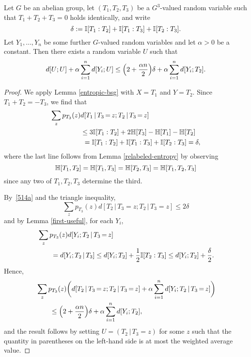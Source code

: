 \begin{lemma}
  \label{lem:get-better}
  Let $G$ be an abelian group, let $(T_1,T_2,T_3)$ be a $G^3$-valued random variable such that $T_1+T_2+T_3=0$ holds identically, and write
  \[
    \delta := \mathbb{I}[T_1 : T_2] + \mathbb{I}[T_1 : T_3] + \mathbb{I}[T_2 : T_3].
  \]
  Let $Y_1,\dots,Y_n$ be some further $G$-valued random variables and let $\alpha>0$ be a constant.
  Then there exists a random variable $U$ such that
  \begin{equation}
    \label{eq:get-better}
    d[U;U] + \alpha \sum_{i=1}^n d[Y_i;U] \leq \Bigl(2 + \frac{\alpha n}{2} \Bigr) \delta + \alpha \sum_{i=1}^n d[Y_i;T_2].
  \end{equation}
\end{lemma}
\begin{proof}%
  We apply Lemma \ref{entropic-bsg} with $X=T_1$ and $Y=T_2$.
  Since $T_1+T_2=-T_3$, we find that
  \begin{align}\nonumber
    \sum_{z} p_{T_3}(z) & d[T_1 \,|\, T_3 \mathop{=} z;T_2 \,|\, T_3 \mathop{=} z] \\ \nonumber
    &\leq  3 \mathbb{I}[T_1 : T_2] + 2 \mathbb{H}[T_3] - \mathbb{H}[T_1] - \mathbb{H}[T_2] \\
    &\ = \mathbb{I}[T_1 : T_2] + \mathbb{I}[T_1 : T_3] + \mathbb{I}[T_2 : T_3]
    = \delta,\label{514a}
  \end{align}
  where the last line follows from Lemma \ref{relabeled-entropy} by observing
  \[
    \mathbb{H}[T_1,T_2] = \mathbb{H}[T_1,T_3] = \mathbb{H}[T_2,T_3] = \mathbb{H}[T_1,T_2,T_3]
  \]
  since any two of $T_1,T_2,T_3$ determine the third.

  By~\eqref{514a} and the triangle inequality,
  \[
    \sum_z p_{T_3}(z) d[T_2 \,|\, T_3 \mathop{=} z; T_2 \,|\, T_3\mathop{=}z] \leq 2 \delta
  \]
  and by Lemma \ref{first-useful}, for each $Y_i$,
  \begin{align*}
    &\sum_z p_{T_3}(z) d[Y_i; T_2 \,|\, T_3 \mathop{=} z] \\
    &\qquad= d[Y_i; T_2 \,|\, T_3]
                                    \leq d[Y_i;T_2] + \frac12 \mathbb{I}[T_2 : T_3]
                                    \leq d[Y_i;T_2] + \frac{\delta}{2}.
  \end{align*}
  Hence,
  \begin{align*}
    &\sum_z p_{T_3}(z) \bigg( d[T_2 \,|\, T_3 \mathop{=} z; T_2 \,|\, T_3 \mathop{=} z] + \alpha \sum_{i=1}^n d[Y_i;T_2 \,|\, T_3 \mathop{=} z] \bigg) \\
    &\qquad \leq
    \Bigl(2 + \frac{\alpha n}{2} \Bigr) \delta + \alpha \sum_{i=1}^n d[Y_i; T_2],
  \end{align*}
  and the result follows by setting $U=(T_2 \,|\, T_3 \mathop{=} z)$ for some $z$ such that the quantity in parentheses on the left-hand side is at most the weighted average value.
\end{proof}


